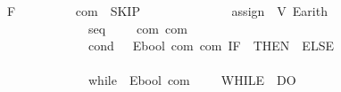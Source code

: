 \begin{isabellebody}
\isamarkupfalse%
\ {\isachardoublequoteopen}F{\isachardoublequoteclose}\ \ \ \ \ {\isacharequal}{\kern0pt}\ {\isachardoublequoteopen}{\isasymsigma}\ {\isasymRightarrow}\ {\isasymsigma}{\isachardoublequoteclose}\isanewline
\isanewline
{}\isamarkupfalse%
\ com\ {\isacharequal}{\kern0pt}\ SKIP\isanewline
\ \ \ \ \ \ \ \ \ \ \ \ \ {\isacharbar}{\kern0pt}\ assign\ \ V\ E\isactrlsub a\isactrlsub r\isactrlsub i\isactrlsub t\isactrlsub h\ \ \ \ \ \ \ {\isacharparenleft}{\kern0pt}{\isachardoublequoteopen}\ {\isacharunderscore}{\kern0pt}\ {\isacharcolon}{\kern0pt}{\isacharequal}{\kern0pt}\ {\isacharunderscore}{\kern0pt}{\isachardoublequoteclose}\ {\isacharbrackleft}{\kern0pt}{}{}{\isacharcomma}{\kern0pt}{}{}{\isacharbrackright}{\kern0pt}{}{}{\isacharparenright}{\kern0pt}\isanewline
\ \ \ \ \ \ \ \ \ \ \ \ \ {\isacharbar}{\kern0pt}\ seq\ \ \ \ \ com\ com\ \ \ \ \ \ \ {\isacharparenleft}{\kern0pt}\ {\isachardoublequoteopen}{\isacharsemicolon}{\kern0pt}{\isachardoublequoteclose}\ {}{}{\isacharparenright}{\kern0pt}\isanewline
\ \ \ \ \ \ \ \ \ \ \ \ \ {\isacharbar}{\kern0pt}\ cond\ \ \ {\isachardoublequoteopen}E\isactrlsub b\isactrlsub o\isactrlsub o\isactrlsub l{\isachardoublequoteclose}\ com\ com\ {\isacharparenleft}{\kern0pt}{\isachardoublequoteopen}IF\ {\isacharparenleft}{\kern0pt}{\isacharunderscore}{\kern0pt}{\isacharparenright}{\kern0pt}{\isacharslash}{\kern0pt}\ THEN\ {\isacharparenleft}{\kern0pt}{\isacharunderscore}{\kern0pt}{\isacharparenright}{\kern0pt}{\isacharslash}{\kern0pt}\ ELSE\ {\isacharparenleft}{\kern0pt}{\isacharunderscore}{\kern0pt}{\isacharparenright}{\kern0pt}{\isacharslash}{\kern0pt}{\isachardoublequoteclose}\ \isanewline
\ \ \ \ \ \ \ \ \ \ \ \ \ \ \ \ \ \ \ \ \ \ \ \ \ \ \ \ \ \ \ \ \ \ \ \ \ \ \ \ \ \ \ \ \ \ \ {\isacharbrackleft}{\kern0pt}{}{\isacharcomma}{\kern0pt}{}{\isacharcomma}{\kern0pt}{}{}{\isacharbrackright}{\kern0pt}{}{}{\isacharparenright}{\kern0pt}\isanewline
\ \ \ \ \ \ \ \ \ \ \ \ \ {\isacharbar}{\kern0pt}\ while\ \ {\isachardoublequoteopen}E\isactrlsub b\isactrlsub o\isactrlsub o\isactrlsub l{\isachardoublequoteclose}\ com\ \ \ \ \ {\isacharparenleft}{\kern0pt}{\isachardoublequoteopen}WHILE\ {\isacharparenleft}{\kern0pt}{\isacharunderscore}{\kern0pt}{\isacharparenright}{\kern0pt}{\isacharslash}{\kern0pt}\ DO\ {\isacharparenleft}{\kern0pt}{\isacharunderscore}{\kern0pt}{\isacharparenright}{\kern0pt}{\isachardoublequoteclose}\ {\isacharbrackleft}{\kern0pt}{}{\isacharcomma}{\kern0pt}{}{}{\isacharbrackright}{\kern0pt}{}{}{\isacharparenright}{\kern0pt}\isanewline

\end{isabellebody}
